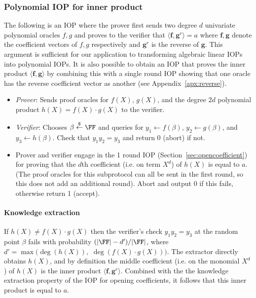  

\subsubsection{Polynomial IOP for inner product}\label{sec:innerproduct}
The following is an IOP where the prover first sends two degree $d$ univariate polynomial oracles $f, g$ and proves to the verifier that $\langle \mathbf{f}, \mathbf{g}^r \rangle = a$ where $\mathbf{f}, \mathbf{g}$ denote the coefficient vectors of $f, g$ respectively and $\mathbf{g}^r$ is the reverse of $\mathbf{g}$. This argument is sufficient for our application to transforming algebraic linear IOPs into polynomial IOPs. It is also possible to obtain an IOP that proves the inner product $\langle \mathbf{f}, \mathbf{g} \rangle$ by combining this with a single round IOP showing that one oracle has the reverse coefficient vector as another (see Appendix~\ref{apx:reverse}).  

\begin{itemize}
\item \emph{Prover}: Sends proof oracles for $f(X)$, $g(X)$, and the degree $2d$ polynomial product $h(X) = f(X)\cdot g(X)$ to the verifier. 
\item \emph{Verifier}: Chooses $\beta \sample \FF$ and queries for $y_1 \leftarrow f(\beta)$, $y_2 \leftarrow g(\beta)$, and $y_3 \leftarrow h(\beta)$. Check that $y_1 y_2 = y_3$ and return $0$ (abort) if not.
\item Prover and verifier engage in the 1 round IOP (Section~\ref{sec:opencoefficient}) for proving that the $d$th coefficient (i.e. on term $X^d$) of $h(X)$ is equal to $a$. (The proof oracles for this subprotocol can all be sent in the first round, so this does not add an additional round). Abort and output $0$ if this fails, otherwise return 1 (accept). 
\end{itemize}

\paragraph{Knowledge extraction} If $h(X) \neq f(X) \cdot g(X)$ then the verifier's check $y_1 y_2 = y_3$ at the random point $\beta$ fails with probability $(|\FF| - d')/|\FF|$, where $d' = \max(\deg(h(X)),$ $\deg(f(X)\cdot{}g(X)))$. The extractor directly obtains $h(X)$, and by definition the middle coefficient (i.e. on the monomial $X^d$) of $h(X)$ is the inner product $\langle \mathbf{f}, \mathbf{g}^r \rangle$. Combined with the the knowledge extraction property of the IOP for opening coefficients, it follows that this inner product is equal to $a$.  

